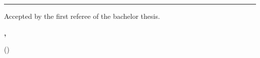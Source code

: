 \vspace*{\fill}

\rule{1.0\textwidth}{0.6pt}

\vspace*{0.75em}

Accepted by the first referee of the bachelor thesis.

\textbf{\myplace, \submissiontime}

\vspace*{4em}

\dotfill \hspace*{8cm} 

\hspace*{0.82cm}(\textbf{\reviewerone})
